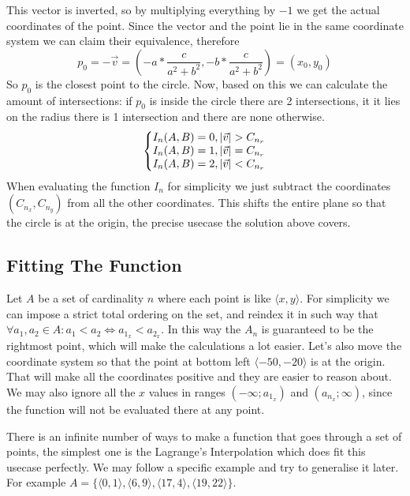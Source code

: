 \documentclass[12pt, titlepage]{article}
\begin{document}
This vector is inverted, so by multiplying everything by $-1$ we get the actual 
coordinates of the point. Since the vector and the point lie in the same coordinate
system we can claim their equivalence, therefore
\begin{equation}
    p_0 = -\vec{v} = (-a * \frac{c}{a^2 + b^2}, -b * \frac{c}{a^2 + b^2}) = (x_0, y_0)
\end{equation}
So $p_0$ is the closest point to the circle.
Now, based on this we can calculate the amount of intersections: if $p_0$ is inside
the circle there are 2 intersections, it it lies on the radius there is 1 intersection
and there are none otherwise.
\begin{equation}
    \left\{\begin{array}{@{}l@{}}
       I_n(A, B) = 0, |\vec{v}| > C_{n_r}\\
       I_n(A, B) = 1, |\vec{v}| = C_{n_r}\\
       I_n(A, B) = 2, |\vec{v}| < C_{n_r}
    \end{array}\right.
\end{equation}
When evaluating the function $I_n$ for simplicity we just subtract the 
coordinates $(C_{n_x}, C_{n_y})$ from all the other coordinates. This shifts 
the entire plane so that the circle is at the origin, the precise usecase the
solution above covers.

\subsection{Fitting The Function}
Let $A$ be a set of cardinality $n$ where each point is like $\langle x, y \rangle$.
For simplicity we can impose a strict total ordering on the set, and reindex
it in such way that $\forall a_1,a_2 \in A : a_1 < a_2 \Leftrightarrow a_{1_x} < 
a_{2_x}$. In this way the $A_n$ is guaranteed to be the rightmost point, which
will make the calculations a lot easier. Let's also move the coordinate system
so that the point at bottom left $\langle -50, -20 \rangle$ is at the origin.
That will make all the coordinates positive and they are easier to reason about.
We may also ignore all the $x$ values in ranges 
$(-\infty; a_{1_x})$ and $(a_{n_x}; \infty)$, since the function will not be 
evaluated there at any point.

There is an infinite number of ways to make a function that goes through a set of
points, the simplest one is the Lagrange's Interpolation which does fit this 
usecase perfectly. We may follow a specific example and try to generalise it later. 
For example $A = \{\langle 0, 1 \rangle, \langle 6, 9 \rangle, 
\langle 17, 4 \rangle, \langle 19, 22 \rangle\}$.
\end{document}
